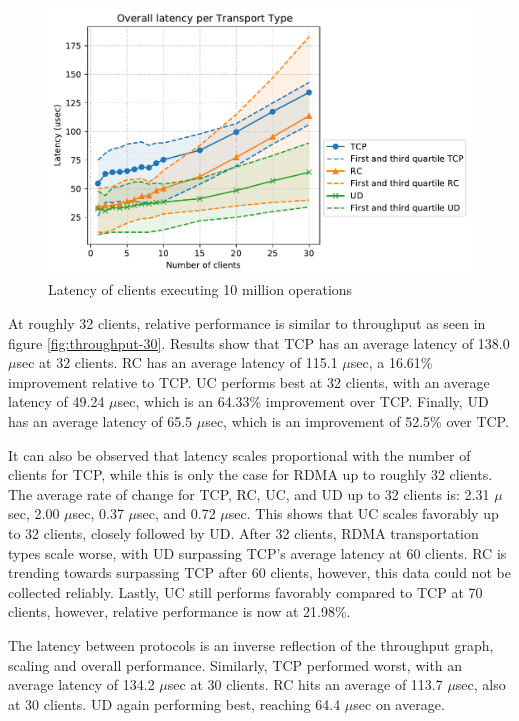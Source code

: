 \begin{figure}
    \centering
    \includegraphics[width=\columnwidth]{figures/PDF/Latency_avg_30}
    \caption{Latency of clients executing 10 million operations}
    \label{fig:latency-30}
\end{figure}

At roughly 32 clients, relative performance is similar to throughput as seen in figure \ref{fig:throughput-30}.
Results show that TCP has an average latency of 138.0 $\mu$sec at 32 clients.
RC has an average latency of 115.1 $\mu$sec, a 16.61\% improvement relative to TCP.
UC performs best at 32 clients, with an average latency of 49.24 $\mu$sec, which is an 64.33\% improvement over TCP.
Finally, UD has an average latency of 65.5 $\mu$sec, which is an improvement of 52.5\% over TCP.

It can also be observed that latency scales proportional with the number of clients for TCP, while this is only the case for RDMA up to roughly 32 clients.
The average rate of change for TCP, RC, UC, and UD up to 32 clients is: 2.31 $\mu$sec, 2.00 $\mu$sec, 0.37 $\mu$sec, and 0.72 $\mu$sec.
This shows that UC scales favorably up to 32 clients, closely followed by UD.
After 32 clients, RDMA transportation types scale worse, with UD surpassing TCP's average latency at 60 clients.
RC is trending towards surpassing TCP after 60 clients, however, this data could not be collected reliably.
Lastly, UC still performs favorably compared to TCP at 70 clients, however, relative performance is now at 21.98\%.





The latency between protocols is an inverse reflection of the throughput graph, scaling and overall performance.
Similarly, TCP performed worst, with an average latency of 134.2 $\mu$sec at 30 clients.
RC hits an average of 113.7 $\mu$sec, also at 30 clients.
UD again performing best, reaching 64.4 $\mu$sec on average.

